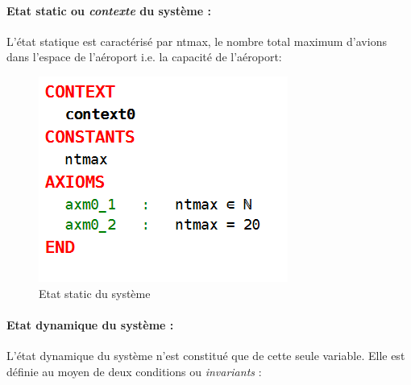 \paragraph{Etat static ou \textit{contexte} du système :}
L'état statique est caractérisé par ntmax, le nombre total maximum d'avions dans  l'espace de l'aéroport i.e. la capacité de l'aéroport:
\begin{figure}[H]
	\begin{center}	
		\includegraphics[scale=0.8]{images/ctx0}
		\caption{Etat static du système}
		\label{ctx0}
	\end{center}
\end{figure}

\paragraph{Etat dynamique du système :}
 L'état dynamique du système n'est constitué que de cette seule variable. Elle est définie au moyen de deux conditions ou \textit{invariants} :
%   
%   

